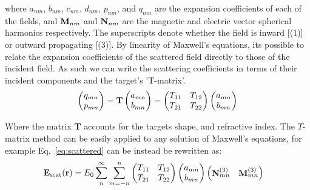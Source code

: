 where $a_{nm}$, $b_{nm}$, $c_{nm}$, $d_{nm}$, $p_{nm}$, and $q_{nm}$
are the expansion coefficients of each of the fields, and ${\bf M}_
{nm}$ and ${\bf N}_{nm}$ are the magnetic and electric vector 
spherical harmonics respectively. The superscripts denote whether 
the field is inward [(1)] or outward propagating [(3)]. By linearity 
of Maxwell's equations, its possible to relate the expansion 
coefficients of the scattered field directly to those of the incident 
field. As such we can write the scattering coefficients in terms of 
their incident components and the target's 'T-matrix'.
\begin{align}
	\label{eq:t_matrix}
	\begin{pmatrix}
		q_{mn} \\
		p_{mn} 
	\end{pmatrix}
	= \bold{T} 
	\begin{pmatrix}
		a_{mn} \\
		b_{mn}
	\end{pmatrix}
	= \begin{pmatrix}
		T_{11} & T_{12} \\
		T_{21} & T_{22}
	\end{pmatrix}
	\begin{pmatrix}
		a_{mn} \\
		b_{mn}
	\end{pmatrix}
\end{align}

Where the matrix \textbf{T} accounts for the targets shape, 
and refractive index. The $T$-matrix method can be easily 
applied to any solution of Maxwell's equations, for example 
Eq.~\eqref{eq:scattered} can be instead be rewritten as:
\begin{align}
{\bf E}_{\rm scat}({\bf r})
&=
E_0 \sum_{n}^\infty \sum_{m=-n}^n 
\begin{pmatrix}
	T_{11} & T_{12} \\
	T_{21} & T_{22}
\end{pmatrix}
\begin{pmatrix}
	a_{mn} \\
	b_{mn}
\end{pmatrix}
\begin{pmatrix}
	{\bf N}_{mn}^{(3)} & {\bf M}_{mn}^{(3)}
\end{pmatrix}
\end{align}
  
